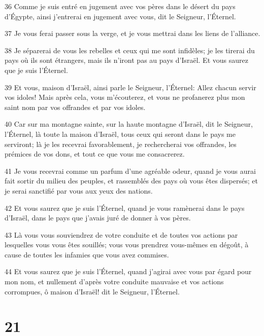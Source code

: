 \par 36 Comme je suis entré en jugement avec vos pères dans le désert du pays d'Égypte, ainsi j'entrerai en jugement avec vous, dit le Seigneur, l'Éternel.
\par 37 Je vous ferai passer sous la verge, et je vous mettrai dans les liens de l'alliance.
\par 38 Je séparerai de vous les rebelles et ceux qui me sont infidèles; je les tirerai du pays où ils sont étrangers, mais ils n'iront pas au pays d'Israël. Et vous saurez que je suis l'Éternel.
\par 39 Et vous, maison d'Israël, ainsi parle le Seigneur, l'Éternel: Allez chacun servir vos idoles! Mais après cela, vous m'écouterez, et vous ne profanerez plus mon saint nom par vos offrandes et par vos idoles.
\par 40 Car sur ma montagne sainte, sur la haute montagne d'Israël, dit le Seigneur, l'Éternel, là toute la maison d'Israël, tous ceux qui seront dans le pays me serviront; là je les recevrai favorablement, je rechercherai vos offrandes, les prémices de vos dons, et tout ce que vous me consacrerez.
\par 41 Je vous recevrai comme un parfum d'une agréable odeur, quand je vous aurai fait sortir du milieu des peuples, et rassemblés des pays où vous êtes dispersés; et je serai sanctifié par vous aux yeux des nations.
\par 42 Et vous saurez que je suis l'Éternel, quand je vous ramènerai dans le pays d'Israël, dans le pays que j'avais juré de donner à vos pères.
\par 43 Là vous vous souviendrez de votre conduite et de toutes vos actions par lesquelles vous vous êtes souillés; vous vous prendrez vous-mêmes en dégoût, à cause de toutes les infamies que vous avez commises.
\par 44 Et vous saurez que je suis l'Éternel, quand j'agirai avec vous par égard pour mon nom, et nullement d'après votre conduite mauvaise et vos actions corrompues, ô maison d'Israël! dit le Seigneur, l'Éternel.

\chapter{21}

